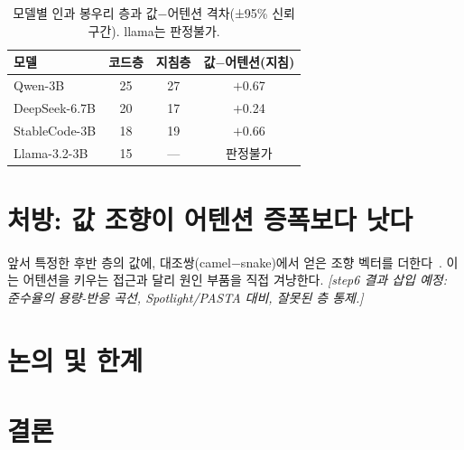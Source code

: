 \documentclass[twocolumn, 10pt]{article}
\begin{document}
\begin{table}[t]
\caption{모델별 인과 봉우리 층과 값$-$어텐션 격차(±95\% 신뢰구간). llama는 판정불가.}
\label{tab:peak}
\begin{center}
\small
\begin{tabular}{l|c|c|c}
\hline
모델 & 코드층 & 지침층 & 값$-$어텐션(지침) \\
\hline
Qwen-3B     & 25 & 27 & $+$0.67 \\
DeepSeek-6.7B & 20 & 17 & $+$0.24 \\
StableCode-3B & 18 & 19 & $+$0.66 \\
Llama-3.2-3B & 15 & --- & 판정불가 \\
\hline
\end{tabular}
\end{center}
\end{table}

\section{처방: 값 조향이 어텐션 증폭보다 낫다}
앞서 특정한 후반 층의 값에, 대조쌍(camel$-$snake)에서 얻은 조향 벡터를
더한다~\cite{rimsky:caa}. 이는 어텐션을 키우는 접근과 달리 원인 부품을 직접 겨냥한다.
\emph{[step6 결과 삽입 예정: 준수율의 용량-반응 곡선, Spotlight/PASTA 대비, 잘못된 층 통제.]}

\section{논의 및 한계}
\label{sec:limit}

\section{결론}



\end{document}

